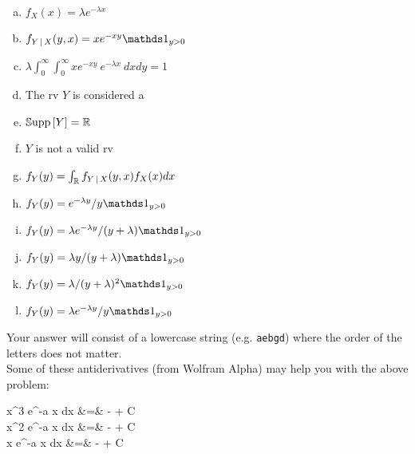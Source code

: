 \documentclass[12pt,landscape]{article}
\newcommand{\instr}{\small Your answer will consist of a lowercase string (e.g. \texttt{aebgd}) where the order of the letters does not matter. \normalsize}
\begin{document}
\begin{enumerate}[(a)]
\item $f_X(x) = \lambda e^{-\lambda x}$
\item $f_{Y\,|\,X}(y,x) = xe^{-xy} \indic{y > 0}$
\item $\lambda  \displaystyle \int_0^\infty \displaystyle\int_0^\infty xe^{-xy} ~e^{-\lambda x}   ~dx dy = 1$ 
\item The rv $Y$ is considered a 

\item $\mathbb{S}\text{upp}\left[Y\right] = \mathbb{R}$
\item $Y$ is not a valid rv
\item $f_Y(y) = \int_{\mathbb{R}} f_{Y\,|\,X}(y,x) f_X(x) dx$

\item $f_Y(y) = e^{-\lambda y} / y \indic{y>0}$
\item $f_Y(y) = \lambda e^{-\lambda y} / (y + \lambda) \indic{y>0}$
\item $f_Y(y) = \lambda y / (y + \lambda) \indic{y>0}$
\item $f_Y(y) = \lambda / (y + \lambda)^2 \indic{y>0}$
\item $f_Y(y) = \lambda e^{-\lambda y} / y \indic{y>0}$
\end{enumerate}
\eenum\instr \\

\noindent Some of these antiderivatives (from Wolfram Alpha) may help you with the above problem:

\beqn
\int x^3 e^{-a x} dx &=& -\displaystyle{} + C \\
\int x^2 e^{-a x} dx &=&  -\displaystyle{} + C \\
\int x e^{-a x} dx &=& -\displaystyle{} + C
\eeqn
\pagebreak

\end{document}
